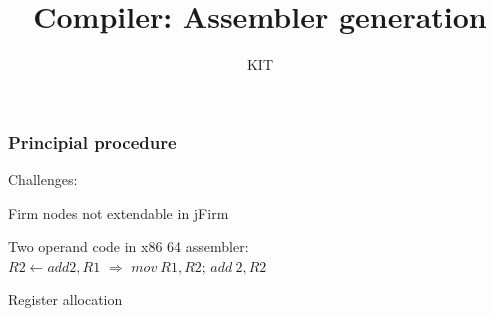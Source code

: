 \documentclass[t]{beamer}
\title[]{Compiler: Assembler generation}
\author[]{KIT}
\institute[]{KARLSRUHE INSTITUTE OF TECHNOLOGY (KIT)}
\begin{document}
\begin{frame}
  \maketitle
\end{frame}

\begin{frame}
  \frametitle{Principial procedure}


 {
Challenges:
}
\begin{itemize}
 { \item Firm nodes not extendable in jFirm }
 { \item Two operand code in x86 64 assembler:\\
$R2 \leftarrow add 2, R1$ $\Rightarrow$ $mov\ R1, R2$; $add\ 2, R2$ }
 { \item Register allocation }
\end{itemize}
\end{frame}
\end{document}

